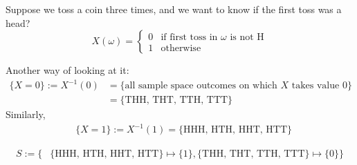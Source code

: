 \begin{ex}
Suppose we toss a coin three times, and we want to know if the first toss was a head?
    \begin{equation*}
    X(\omega) =
    \begin{cases}
    0 & \text{if first toss in } \omega \text{ is not H} \\
    1 & \text{otherwise}
    \end{cases}
    \end{equation*}


\begin{center}
\end{center}

Another way of looking at it:
\begin{equation*}
\begin{aligned}
    \{ X = 0 \} := X^{-1}(0) & = \{ \text{all sample space outcomes on which } X \text{ takes value 0} \} \\
    & = \{ \text{THH, THT, TTH, TTT} \}
\end{aligned}
\end{equation*}
Similarly,
\begin{equation*}
\begin{aligned}
    & \{ X = 1 \} := X^{-1}(1) = \{ \text{HHH, HTH, HHT, HTT} \}
\end{aligned}
\end{equation*}

\begin{equation*}
\begin{aligned}
    S := \{ & \{ \text{HHH, HTH, HHT, HTT} \} \mapsto \{1\}, \{ \text{THH, THT, TTH, TTT} \} \mapsto \{ 0 \} \}
\end{aligned}
\end{equation*}

\end{ex}


